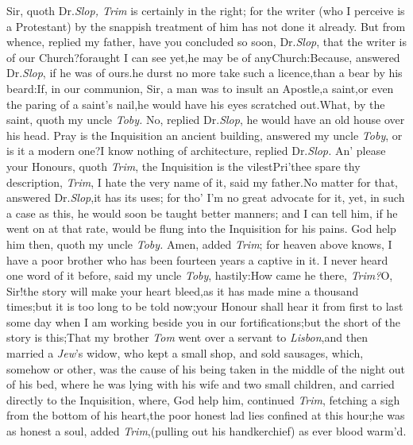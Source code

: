 \documentclass{article}
\begin{document}
Sir, quoth Dr.\@ \textit{Slop, Trim} is certainly in the right; for
the writer (who I perceive is a Protestant) by the snappish
treatment of him has not done it already. But
from whence, replied my father,\break
have you concluded so soon, Dr.\@ \textit{Slop},\break
that the writer is of our Church?\tsk for\break aught I
can see yet,\tsk he may be of any\break Church:\tsh Because,
answered Dr.\@ \textit{Slop}, if he was of ours.\tsk he durst no more
take such a licence,\tsk than a bear by his beard:\tsk If, in
our communion, Sir, a man was to insult an Apostle,\tsh a
saint,\tsh or even the paring of a saint’s
nail,\tsk he would have his eyes scratched out.\tsk What, by
the saint, quoth my\pb
uncle \textit{Toby.} No, replied Dr.\@ \textit{Slop},\tsk
he would have an old house over his head. Pray is the Inquisition
an ancient building, answered my uncle \textit{Toby}, or is it a
modern one?\tsk I know nothing of architecture, replied
Dr.\@ \textit{Slop.}\tsh
An’ please your Honours, quoth \textit{Trim}, the Inquisition is the
vilest\tsh Pri’thee spare thy description, \textit{Trim}, I
hate the very name of it, said my father.\tsk No matter for that,
answered Dr.\@ \textit{Slop},\tsk it has its uses; for tho’
I’m no great advocate for it, yet, in such a case as this, he
would soon be taught better manners; and I can tell him, if he went
on at that rate, would be flung into the Inquisition for his pains.
God help him then, quoth my uncle \textit{Toby.} Amen, added
\textit{Trim}; for heaven above knows, I have a poor brother who has
been fourteen years a captive in it.\tsk\break
I never heard one word of it before, said\pb
my uncle \textit{Toby}, hastily:\tsk How came he
there, \textit{Trim?}\tsh O, Sir!\@ the story will make your
heart bleed,\tsk as it has made mine a thousand times;\tsk but
it is too long to be told now;\tsk your Honour shall hear it from
first to last some day when I am working beside you in our
fortifications;\tsk but the short of the story is
this;\tsk That my brother \textit{Tom} went over a servant to
\textit{Lisbon},\tsk and then married a \textit{Jew}’s widow, who kept
a small shop, and sold sausages, which, somehow or other, was the cause of
his being taken in the middle of the night out of his bed, where he
was lying with his wife and two small children, and carried
directly to the Inquisition, where, God help him, continued
\textit{Trim}, fetching a sigh from the bottom of his
heart,\tsk the poor honest lad lies confined at this
hour;\tsh\break he was
as honest a soul, added \textit{Trim},\pb (pulling out his handkerchief)
as ever blood warm’d.\tsh
\end{document}
